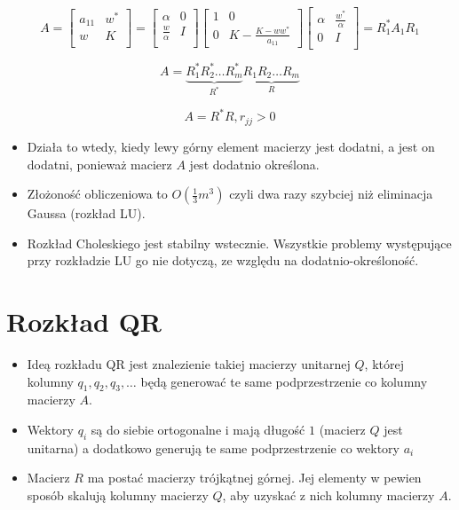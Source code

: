 \documentclass[a4paper]{article}
\begin{document}
\begin{equation*}
    A = 
    \begin{bmatrix}
        a_{11} & w^* \\
        w & K \\
    \end{bmatrix}
    =
    \begin{bmatrix}
        \alpha & 0 \\
        \frac{w}{\alpha} & I \\
    \end{bmatrix}
    \begin{bmatrix}
        1 & 0 \\
        0 & K - \frac{K-ww^*}{a_{11}}
    \end{bmatrix}
    \begin{bmatrix}
        \alpha & \frac{w^*}{\alpha} \\
        0 & I \\
    \end{bmatrix}
    = R_1^*A_1R_1
\end{equation*}

\begin{equation*}
    A= \underbrace{R_1^* R_2^* \dots R_m^*}_{R^*} \underbrace{R_1 R_2 \dots R_m}_{R}
\end{equation*}

\begin{equation*}
    A = R^*R, r_{jj} > 0
\end{equation*}

\begin{itemize}
    \item Działa to wtedy, kiedy lewy górny element macierzy jest dodatni, a jest on dodatni, ponieważ macierz $A$ jest dodatnio określona.
    \item Złożoność obliczeniowa to $O(\frac{1}{3} m^3)$ czyli dwa razy szybciej niż eliminacja Gaussa (rozkład LU).
    \item Rozkład Choleskiego jest stabilny wstecznie. Wszystkie problemy występujące przy rozkładzie LU go nie dotyczą, ze względu na dodatnio-określoność.
\end{itemize}

\section{Rozkład QR}
\begin{itemize}
    \item Ideą rozkładu QR jest znalezienie takiej macierzy unitarnej $Q$, której kolumny $q_1, q_2, q_3, \dots$ będą generować te same podprzestrzenie co kolumny macierzy $A$.
    \item Wektory $q_i$ są do siebie ortogonalne i mają długość $1$ (macierz $Q$ jest unitarna) a dodatkowo generują te same podprzestrzenie co wektory $a_i$
    \item Macierz $R$ ma postać macierzy trójkątnej górnej. Jej elementy w pewien sposób skalują kolumny macierzy $Q$, aby uzyskać z nich kolumny macierzy $A$.
\end{itemize}
\end{document}
